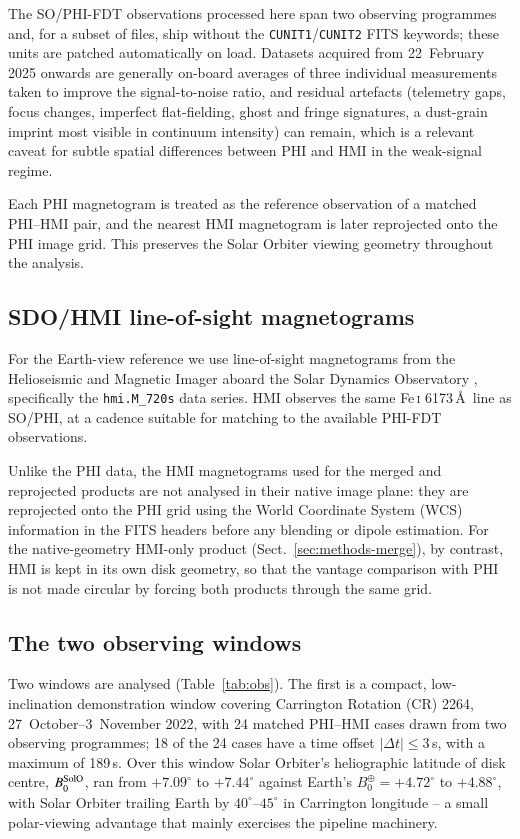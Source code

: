 \documentclass{aa}
\begin{document}
The SO/PHI-FDT observations processed here span two observing programmes and, for a subset of files, ship without the \texttt{CUNIT1}/\texttt{CUNIT2} FITS keywords; these units are patched automatically on load. Datasets acquired from 22~February 2025 onwards are generally on-board averages of three individual measurements taken to improve the signal-to-noise ratio, and residual artefacts (telemetry gaps, focus changes, imperfect flat-fielding, ghost and fringe signatures, a dust-grain imprint most visible in continuum intensity) can remain, which is a relevant caveat for subtle spatial differences between PHI and HMI in the weak-signal regime.

Each PHI magnetogram is treated as the reference observation of a matched PHI--HMI pair, and the nearest HMI magnetogram is later reprojected onto the PHI image grid. This preserves the Solar Orbiter viewing geometry throughout the analysis.

\subsection{SDO/HMI line-of-sight magnetograms}
\label{sec:data-hmi}

For the Earth-view reference we use line-of-sight magnetograms from the Helioseismic and Magnetic Imager \citep[HMI;][]{Scherrer2012} aboard the Solar Dynamics Observatory \citep[SDO;][]{Pesnell2012}, specifically the \texttt{hmi.M\_720s} data series. HMI observes the same Fe\,\textsc{i} 6173\,\AA\ line as SO/PHI, at a cadence suitable for matching to the available PHI-FDT observations.

Unlike the PHI data, the HMI magnetograms used for the merged and reprojected products are not analysed in their native image plane: they are reprojected onto the PHI grid using the World Coordinate System (WCS) information in the FITS headers \citep{Thompson2006} before any blending or dipole estimation. For the native-geometry HMI-only product (Sect.~\ref{sec:methods-merge}), by contrast, HMI is kept in its own disk geometry, so that the vantage comparison with PHI is not made circular by forcing both products through the same grid.

\subsection{The two observing windows}
\label{sec:data-windows}

Two windows are analysed (Table~\ref{tab:obs}). The first is a compact, low-inclination demonstration window covering Carrington Rotation (CR) 2264, 27~October--3~November 2022, with 24 matched PHI--HMI cases drawn from two observing programmes; 18 of the 24 cases have a time offset $|\Delta t| \le 3$\,s, with a maximum of 189\,s. Over this window Solar Orbiter's heliographic latitude of disk centre, $B_0^{\rm SolO}$, ran from $+7.09^{\circ}$ to $+7.44^{\circ}$ against Earth's $B_0^{\oplus} = +4.72^{\circ}$ to $+4.88^{\circ}$, with Solar Orbiter trailing Earth by $40^{\circ}$--$45^{\circ}$ in Carrington longitude -- a small polar-viewing advantage that mainly exercises the pipeline machinery.
\end{document}
